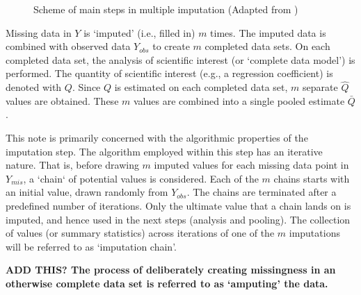 \documentclass[article]{jss}
\begin{document}
\begin{figure}
\label{fig:steps}
\centering
	\large{}
\caption{Scheme of main steps in multiple imputation (Adapted from \cite[\S~1.4.1]{buur18})}
\end{figure}

Missing data in $Y$ is `imputed' (i.e., filled in) $m$ times. The imputed data is combined with observed data $Y_{obs}$ to create $m$ completed data sets. On each completed data set, the analysis of scientific interest (or `complete data model') is performed. The quantity of scientific interest (e.g., a regression coefficient) is denoted with $Q$. Since $Q$ is estimated on each completed data set, $m$ separate $\hat{Q}$ values are obtained. These $m$ values are combined into a single pooled estimate $\bar{Q}$.

This note is primarily concerned with the algorithmic properties of the imputation step. The algorithm employed within this step has an iterative nature. That is, before drawing $m$ imputed values for each missing data point in $Y_{mis}$, a `chain` of potential values is considered. Each of the $m$ chains starts with an initial value, drawn randomly from $Y_{obs}$. The chains are terminated after a predefined number of iterations. Only the ultimate value that a chain lands on is imputed, and hence used in the next steps (analysis and pooling). The collection of values (or summary statistics) across iterations of one of the $m$ imputations will be referred to as `imputation chain'. 

\textbf{ADD THIS? The process of deliberately creating missingness in an otherwise complete data set is referred to as `amputing' the data.} 
\end{document}
